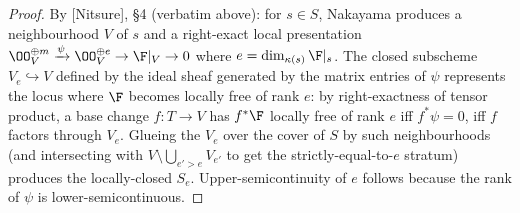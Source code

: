 \begin{proof}
  
  By [Nitsure], \S4 (verbatim above): for \(s \in S\), Nakayama produces a
  neighbourhood \(V\) of \(s\) and a right-exact local presentation
  \(\OO_V^{\oplus m} \xrightarrow{\psi} \OO_V^{\oplus e} \to \F|_V \to 0\) where
  \(e = \dim_{\kappa(s)} \F|_s\).  The closed subscheme \(V_e \hookrightarrow V\)
  defined by the ideal sheaf generated by the matrix entries of \(\psi\)
  represents the locus where \(\F\) becomes locally free of rank \(e\): by
  right-exactness of tensor product, a base change \(f : T \to V\) has
  \(f^* \F\) locally free of rank \(e\) iff \(f^* \psi = 0\), iff \(f\) factors
  through \(V_e\).  Glueing the \(V_e\) over the cover of \(S\) by such
  neighbourhoods (and intersecting with \(V \setminus \bigcup_{e' > e} V_{e'}\)
  to get the strictly-equal-to-\(e\) stratum) produces the locally-closed
  \(S_e\). Upper-semicontinuity of \(e\) follows because the rank of \(\psi\) is
  lower-semicontinuous.
\end{proof}

